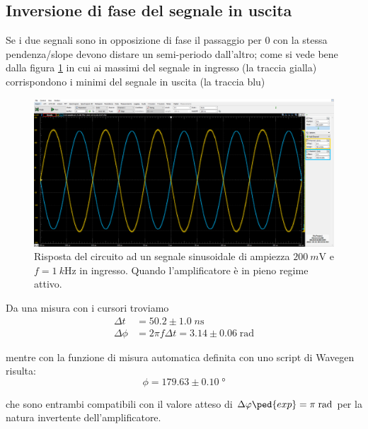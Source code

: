 \documentclass[10pt,a4paper]{article}
\begin{document}
\subsection{Inversione di fase del segnale in uscita}
Se i due segnali sono in opposizione di fase il passaggio per 0 con la stessa
pendenza/slope devono distare un semi-periodo dall'altro; come si vede bene
dalla figura \ref{fig: Alin} in cui ai massimi del segnale in ingresso (la
traccia gialla) corrispondono i minimi del segnale in uscita (la traccia blu)
\begin{figure}[htb]
\centering
\includegraphics[scale=0.335]{Alin200mV}
\caption{Risposta del circuito ad un segnale sinusoidale di ampiezza
$\SI{200}{m\V}$ e $f = \SI{1}{k\Hz}$ in ingresso. Quando l'amplificatore
è in pieno regime attivo. \label{fig: Alin}}
\end{figure}

Da una misura con i cursori troviamo
\begin{align*}
\Delta t &= 50.2 \pm 1.0 \; \si{n\s}\\
\Delta \phi &= 2\pi f \Delta t = 3.14 \pm 0.06 \; \si{\radian}
\end{align*}

mentre con la funzione di misura automatica definita con uno script di Wavegen
risulta:
\[
\phi = 179.63 \pm 0.10 \; \si{\degree}
\]

che sono entrambi compatibili con il valore atteso di $\Delta \phi\ped{exp}
= \pi \; \si{\radian}$ per la natura invertente dell'amplificatore.
\end{document}
